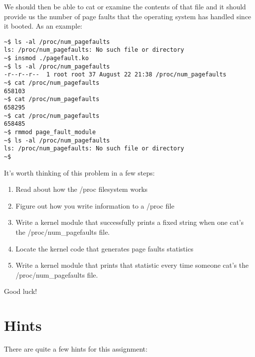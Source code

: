\documentclass[11pt]{article}
\begin{document}
We should then be able to cat or examine the contents of that file and it should provide us the number of page faults that the operating system has handled since it booted. As an example:

\begin{verbatim}
~$ ls -al /proc/num_pagefaults
ls: /proc/num_pagefaults: No such file or directory
~$ insmod ./pagefault.ko 
~$ ls -al /proc/num_pagefaults
-r--r--r--  1 root root 37 August 22 21:38 /proc/num_pagefaults
~$ cat /proc/num_pagefaults 
658103
~$ cat /proc/num_pagefaults 
658295
~$ cat /proc/num_pagefaults 
658485
~$ rmmod page_fault_module
~$ ls -al /proc/num_pagefaults
ls: /proc/num_pagefaults: No such file or directory
~$
\end{verbatim}

It's worth thinking of this problem in a few steps:

\begin{enumerate}
\item Read about how the /proc filesystem works
\item Figure out how you write information to a /proc file
\item Write a kernel module that successfully prints a fixed string when one cat's the /proc/num\_pagefaults file. 
\item Locate the kernel code that generates page faults statistics
\item Write a kernel module that prints that statistic every time someone cat's the /proc/num\_pagefaults file.
\end{enumerate}

Good luck!

\newpage

\section*{Hints}

There are quite a few hints for this assignment:
\end{document}
